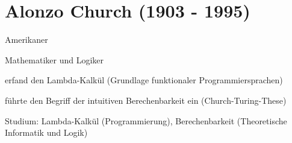 \documentclass[a4paper,12pt]{report}
\begin{document}
\section*{Alonzo Church (1903 - 1995)}
\begin{itemize*}
	\item Amerikaner
	\item Mathematiker und Logiker
	\item erfand den Lambda-Kalkül (Grundlage funktionaler Programmiersprachen)
	\item führte den Begriff der intuitiven Berechenbarkeit ein (Church-Turing-These)
	\item Studium: Lambda-Kalkül (Programmierung), Berechenbarkeit (Theoretische Informatik
		  und Logik)
\end{itemize*}
\end{document}
